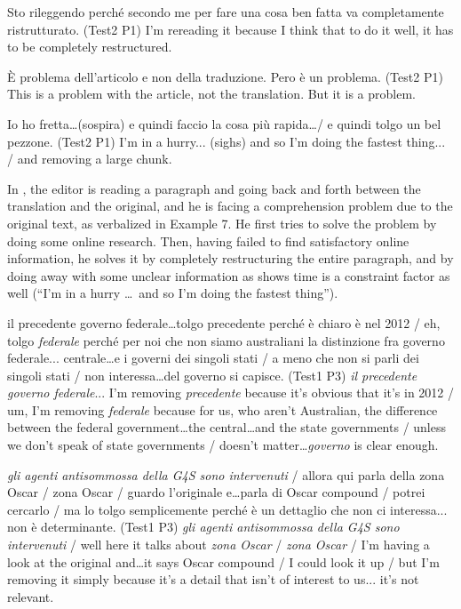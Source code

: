 \documentclass[output=paper]{LSP/langsci}
\begin{document}
\ea \label{troqe-marchan:ex:6} 
\glt Sto rileggendo perché secondo me per fare una cosa ben fatta va completamente ristrutturato. (Test2 P1)
\glt I'm rereading it because I think that to do it well, it has to be completely restructured.
\z

\ea \label{troqe-marchan:ex:7} 
\glt È problema dell'articolo e non della traduzione. Pero è un problema. (Test2 P1)
\glt This is a problem with the article, not the translation. But it is a problem.
\z

\ea \label{troqe-marchan:ex:8} 
\glt Io ho fretta\ldots  (sospira) e quindi faccio la cosa più rapida\ldots  / e quindi tolgo un bel pezzone. (Test2 P1)
\glt I'm in a hurry... (sighs) and so I'm doing the fastest thing... / and removing a large chunk.
\z 

In , the editor is reading a paragraph and going back and forth between the translation and the original, and he is facing a comprehension problem due to the original text, as verbalized in Example 7. He first tries to solve the problem by doing some online research. Then, having failed to find satisfactory online information, he solves it by completely restructuring the entire paragraph, and by doing away with some unclear information as  shows time is a constraint factor as well (``I'm in a hurry \ldots~and so I'm doing the fastest thing''). 

\ea \label{troqe-marchan:ex:9} 
\glt il precedente governo federale\ldots  tolgo precedente perché è chiaro è nel 2012 / eh, tolgo \textit{federale} perché per noi che non siamo australiani la distinzione fra governo federale... centrale\ldots  e i governi dei singoli stati / a meno che non si parli dei singoli stati / non interessa\ldots  del governo si capisce. (Test1 P3)
\glt \textit{il precedente governo federale}... I'm removing \textit{precedente} because it's obvious that it's in 2012 / um, I'm removing \textit{federale} because for us, who aren't Australian, the difference between the federal government\ldots the central\ldots  and the state governments / unless we don't speak of state governments / doesn't matter\ldots   \textit{governo} is clear enough.
\z 

\ea \label{troqe-marchan:ex:10} 
\glt \textit{gli agenti antisommossa della G4S sono intervenuti} / allora qui parla della zona Oscar / zona Oscar / guardo l'originale e\ldots  parla di Oscar compound / potrei cercarlo / ma lo tolgo semplicemente perché è un dettaglio che non ci interessa... non è determinante. (Test1 P3)
\glt \textit{gli agenti antisommossa della G4S sono intervenuti} / well here it talks about \textit{zona Oscar} / \textit{zona Oscar} / I'm having a look at the original and\ldots  it says Oscar compound / I could look it up / but I'm removing it simply because it's a detail that isn't of interest to us... it's not relevant.
\z
\end{document}
